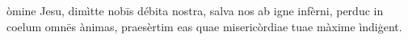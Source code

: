 òmine Jesu, dimìtte nobīs débita nostra, salva nos ab igne infèrni, perduc in coelum omnēs ànimas, praesèrtim eas quae misericòrdiae tuae màxime ìndiģent.
